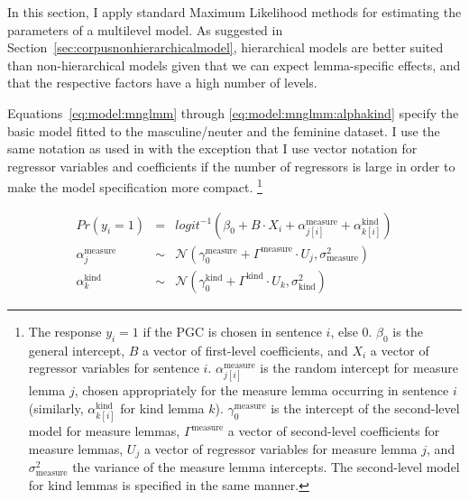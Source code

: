\documentclass[USenglish]{article}
\begin{document}


In this section, I apply standard Maximum Likelihood methods for estimating the parameters of a multilevel model.
As suggested in Section~\ref{sec:corpusnonhierarchicalmodel}, hierarchical models are better suited than non-hierarchical models given that we can expect lemma-specific effects, and that the respective factors have a high number of levels.

Equations~\ref{eq:model:mnglmm} through \ref{eq:model:mnglmm:alphakind} specify the basic model fitted to the masculine\slash neuter and the feminine dataset.
I use the same notation as used in \cite{GelmanHill2006} with the exception that I use vector notation for regressor variables and coefficients if the number of regressors is large in order to make the model specification more compact.%
\footnote{
The response $y_i=1$ if the PGC is chosen in sentence $i$, else $0$.
$\beta_0$ is the general intercept, $B$ a vector of first-level coefficients, and $X_i$ a vector of regressor variables for sentence $i$.
$\alpha^{\text{measure}}_{j[i]}$ is the random intercept for measure lemma $j$, chosen appropriately for the measure lemma occurring in sentence $i$ (similarly, $\alpha^{\text{kind}}_{k[i]}$ for kind lemma $k$).
$\gamma_0^{\text{measure}}$ is the intercept of the second-level model for measure lemmas, $\Gamma^{\text{measure}}$ a vector of second-level coefficients for measure lemmas, $U_j$ a vector of regressor variables for measure lemma $j$, and $\sigma_{\text{measure}}^2$ the variance of the measure lemma intercepts.
The second-level model for kind lemmas is specified in the same manner.
}

\begin{eqnarray}
    \label{eq:model:mnglmm}
    Pr(y_i=1) &=& logit^{-1}(\beta_0 + B\cdot X_i + \alpha^{\text{measure}}_{j[i]} + \alpha^{\text{kind}}_{k[i]}) \\
    \alpha^{\text{measure}}_j &\sim& \mathcal{N}(\gamma_0^{\text{measure}} + \Gamma^{\text{measure}}\cdot U_j,\sigma^2_{\text{measure}}) \\
    \alpha^{\text{kind}}_k &\sim& \mathcal{N}(\gamma_0^{\text{kind}} + \Gamma^{\text{kind}}\cdot U_k,\sigma^2_{\text{kind}}) 
  \label{eq:model:mnglmm:alphakind}
\end{eqnarray}
\end{document}
